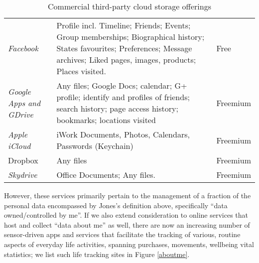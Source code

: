 \documentclass[runningheads,a4paper]{llncs}
\begin{document}
\begin{table}
\begin{tabular}{p{2.2cm} p{8cm} l}

\emph{Facebook} & Profile incl. Timeline; Friends; Events; Group memberships; Biographical history; States favourites; Preferences; Message archives; Liked pages, images, products; Places visited. & Free \\

\emph{Google Apps and GDrive} & Any files; Google Docs; calendar; G+ profile; identify and profiles of friends; search history; page access history; bookmarks; locations visited & Freemium\\

\emph{Apple iCloud} & iWork Documents, Photos, Calendars, Passwords (Keychain) & Freemium \\
Dropbox & Any files & Freemium \\

\emph{Skydrive} & Office Documents; Any files. & Freemium \\

\end{tabular}
\caption{Commercial third-party cloud storage offerings}
\label{fig:cloudstorage}
\end{table}

However, these services primarily pertain to the management of a fraction of the personal data encompassed by Jones's definition above, specifically ``data owned/controlled by me''.  If we also extend consideration to online services that host and collect ``data about me'' as well, there are now an increasing number of sensor-driven apps and services that facilitate the tracking of various, routine aspects of everyday life activities, spanning purchases, movements, wellbeing vital statistics; we list such life tracking sites in Figure \ref{aboutme}.
\end{document}
